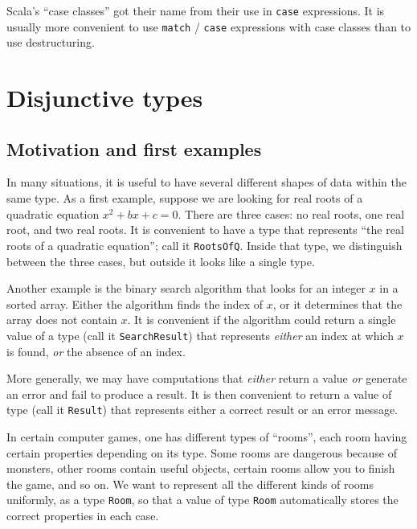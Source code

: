 Scala's ``case classes'' got their name from their use in \lstinline!case!
expressions. It is usually more convenient to use \lstinline!match!
/ \lstinline!case! expressions with case classes than to use destructuring.

\section{Disjunctive types}

\subsection{Motivation and first examples\label{subsec:Disjunctive-Motivation-and-first-examples}}

In many situations, it is useful to have several different shapes
of data within the same type. As a first example, suppose we are looking
for real roots of a quadratic equation $x^{2}+bx+c=0$. There are
three cases: no real roots, one real root, and two real roots. It
is convenient to have a type that represents ``the real roots of
a quadratic equation''; call it \lstinline!RootsOfQ!. Inside that
type, we distinguish between the three cases, but outside it looks
like a single type.

Another example is the binary search algorithm that looks for an integer
$x$ in a sorted array. Either the algorithm finds the index of $x$,
or it determines that the array does not contain $x$. It is convenient
if the algorithm could return a single value of a type (call it \lstinline!SearchResult!)
that represents \emph{either} an index at which $x$ is found, \emph{or}
the absence of an index.

More generally, we may have computations that \emph{either} return
a value \emph{or} generate an error and fail to produce a result.
It is then convenient to return a value of type (call it \lstinline!Result!)
that represents either a correct result or an error message. 

In certain computer games, one has different types of ``rooms'',
each room having certain properties depending on its type. Some rooms
are dangerous because of monsters, other rooms contain useful objects,
certain rooms allow you to finish the game, and so on. We want to
represent all the different kinds of rooms uniformly, as a type \lstinline!Room!,
so that a value of type \lstinline!Room! automatically stores the
correct properties in each case.

